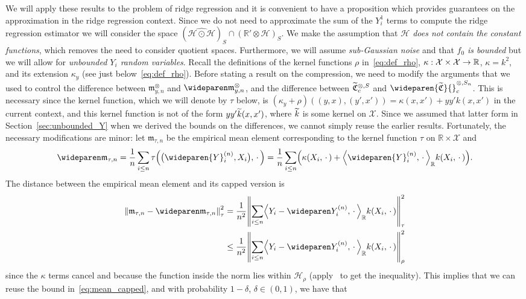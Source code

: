 \documentclass[10pt]{amsart}
\theoremstyle{definition}\newtheorem{defi}[theo]{Definition}\newtheorem{rema}[theo]{Remark}\newtheorem{exam}[theo]{Example}\newtheorem{exem}[theo]{Example}\newtheorem{nota}[theo]{Notation}
\theoremstyle{remark}
\newcommand{\R}{\mathbb{R}}
\newcommand{\dR}{{\R'}}
\newcommand{\X}{\mathcal{X}}
\newcommand{\cH}{\mathcal{H}}
\newcommand{\fkC}{\mathfrak{C}}
\newcommand{\mean}{\mathfrak{m}}
\newcommand{\CovCapn}{\wideparen{\widetilde{\fkC}}{\vphantom{\fkC}}^{\otimes,S_n}_c}
\let\oldtilde\tilde
\renewcommand*{\tilde}[1]{\mathchoice{\widetilde{#1}}{\widetilde{#1}}{\oldtilde{#1}}{\oldtilde{#1}}}
\renewcommand*{\to}{\mathchoice{\longrightarrow}{\rightarrow}{\rightarrow}{\rightarrow}}
\let\originalleft\left
\let\originalright\right
\renewcommand{\left}{\mathopen{}\mathclose\bgroup\originalleft}
\renewcommand{\right}{\aftergroup\egroup\originalright}
\begin{document}
We will apply these results to the problem of ridge regression and it is convenient to have a proposition which provides guarantees on the approximation in the ridge regression context. Since we do not need to approximate the sum of the $Y_i^1$ terms to compute the ridge regression estimator we will consider the space $(\widehat{\cH \odot \cH})_S \cap (\dR \otimes \cH)_S$. We make the assumption that \emph{$\cH$ does not contain the constant functions}, which removes the need to consider quotient spaces. Furthermore, we will assume \emph{sub-Gaussian noise} and that \emph{$f_0$ is bounded} but we will allow for \emph{unbounded $Y_i$ random variables}. Recall the definitions of the kernel functions $\rho$ in~\eqref{eq:def_rho}, $\kappa:\X \times \X \to \R$, $\kappa = k^2$, and its extension $\kappa_y$ (see just below~\eqref{eq:def_rho}). Before stating a result on the compression, we need to modify the arguments that we used to control the difference between $\mean_{y,n}^\otimes$ and $\wideparen \mean_{y,n}^\otimes$, and the difference between $\tilde{\fkC}^{\otimes,S}_c$ and $\CovCapn$. This is necessary since the kernel function, which we will denote by $\tau$ below, is $(\kappa_y + \rho)((y,x), (y',x')) = \kappa(x,x') + yy' k(x,x')$ in the current context, and this kernel function is not of the form $yy' \tilde k(x,x')$, where $\tilde k$ is some kernel on $\X$. Since we assumed that latter form in Section~\ref{sec:unbounded_Y} when we derived the bounds on the differences, we cannot simply reuse the earlier results. Fortunately, the necessary modifications are minor: let $\mean_{\tau,n}$ be the empirical mean element corresponding to the kernel function $\tau$ on $\R \times \X$ and
\[
\wideparen \mean_{\tau,n} = \frac{1}{n} \sum_{i\leq n} \tau\left(\bigl(\wideparen{Y}_i^{(n)}, X_i\bigr), \,\cdot\,\right) = \frac{1}{n} \sum_{i\leq n} \left(\kappa(X_i,\,\cdot\,) + \left\langle \wideparen{Y}_i^{(n)},\,\cdot\, \right\rangle_\R k(X_i,\,\cdot\,)\right).
\]
The distance between the empirical mean element and its capped version is
\begin{align*}
\left\| \mean_{\tau,n} - \wideparen \mean_{\tau,n} \right\|^2_\tau &= \frac{1}{n^2} \left\| \sum_{i\leq n} \left\langle Y_i - \wideparen Y_i^{(n)},\,\cdot\, \right\rangle_\R k(X_i,\,\cdot\,) \right\|^2_\tau \\
&\leq\frac{1}{n^2} \left\| \sum_{i\leq n} \left\langle Y_i - \wideparen Y_i^{(n)},\,\cdot\, \right\rangle_\R k(X_i,\,\cdot\,) \right\|^2_\rho
\end{align*}
since the $\kappa$ terms cancel and because the function inside the norm lies within $\cH_\rho$ (apply~\cite[Theorem~5.4]{PAUL16} to get the inequality). This implies that we can reuse the bound in~\eqref{eq:mean_capped}, and with probability $1-\delta$, $\delta \in (0,1)$, we have that
\end{document}
